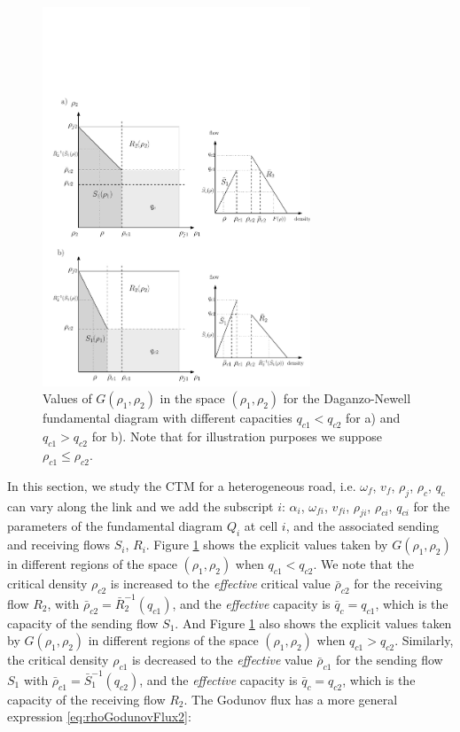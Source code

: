 \begin{figure}[ht]
  \centering
    \includegraphics[width=8cm]{figures/godunovDiagram3.pdf}
    \caption{Values of $G(\rho_{1},\rho_{2})$ in the space $(\rho_{1},\rho_{2})$ for the Daganzo-Newell fundamental diagram with different capacities $q_{c1} < q_{c2}$ for a) and $q_{c1} > q_{c2}$ for b). Note that for illustration purposes we suppose $\rho_{c1}\leq\rho_{c2}$.}
    \label{fig:godunovDiagram3}
\end{figure}

In this section, we study the CTM for a heterogeneous road, i.e. $\omega_{f}$, $v_{f}$, $\rho_{j}$, $\rho_{c}$, $q_{c}$ can vary along the link and we add the subscript $i$: $\alpha_{i}$, $\omega_{fi}$, $v_{fi}$, $\rho_{ji}$, $\rho_{ci}$, $q_{ci}$ for the parameters of the fundamental diagram $Q_{i}$ at cell $i$, and the associated sending and receiving flows $S_{i}$, $R_{i}$. Figure \ref{fig:godunovDiagram3} shows the explicit values taken by $G(\rho_{1},\rho_{2})$ in different regions of the space $(\rho_{1},\rho_{2})$ when $q_{c1} < q_{c2}$. We note that the critical density $\rho_{c2}$ is increased to the \textit{effective} critical value $\bar{\rho}_{c2}$ for the receiving flow $R_{2}$, with $\bar{\rho}_{c2} = \bar{R}^{-1}_{2}(q_{c1})$, and the \textit{effective} capacity is $\bar{q}_{c} = q_{c1}$, which is the capacity of the sending flow $S_{1}$. And Figure \ref{fig:godunovDiagram3} also shows the explicit values taken by $G(\rho_{1},\rho_{2})$ in different regions of the space $(\rho_{1},\rho_{2})$ when $q_{c1} > q_{c2}$. Similarly, the critical density $\rho_{c1}$ is decreased to the \textit{effective} value $\bar{\rho}_{c1}$ for the sending flow $S_{1}$ with $\bar{\rho}_{c1} = \bar{S}^{-1}_{1}(q_{c2})$, and the \textit{effective} capacity is $\bar{q}_{c} = q_{c2}$, which is the capacity of the receiving flow $R_{2}$. The Godunov flux has a more general expression \ref{eq:rhoGodunovFlux2}:

